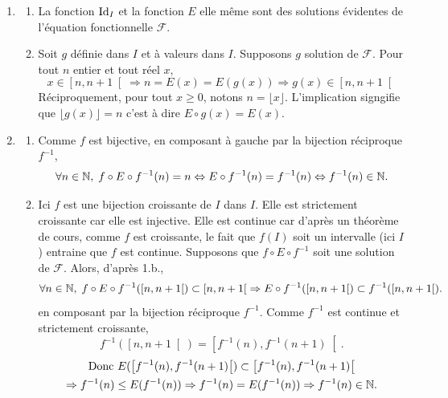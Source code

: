 \begin{enumerate}
  \item 
  \begin{enumerate}
    \item La fonction $\operatorname{Id}_I$ et la fonction $E$ elle même sont des solutions évidentes de l'équation fonctionnelle $\mathcal{F}$.
    \item Soit $g$ définie dans $I$ et à valeurs dans $I$.\newline
Supposons $g$ solution de $\mathcal{F}$. Pour tout $n$ entier et tout réel $x$,
\[
  x \in \left[ n, n + 1 \right[ \Rightarrow n = E(x) = E(g(x)) \Rightarrow  g(x) \in \left[ n, n + 1 \right[
\]
Réciproquement, pour tout $x\geq 0$, notons $n = \lfloor x \rfloor$. L'implication signgifie que $\lfloor g(x) \rfloor = n$ c'est à dire $E \circ g (x) = E(x)$.
  \end{enumerate}

  \item
  \begin{enumerate}
    \item Comme $f$ est bijective, en composant à gauche par la bijection réciproque $f^{-1}$,
\[
\forall n \in \mathbb{N},\;  f \circ E \circ f^{-1}(n) = n \Leftrightarrow E \circ f^{-1}(n) = f^{-1}(n) \Leftrightarrow f^{-1}(n) \in \mathbb{N}.
\]
    
    \item Ici $f$ est une bijection croissante de $I$ dans $I$. Elle est strictement croissante car elle est injective. Elle est continue car d'après un théorème de cours, comme $f$ est croissante, le fait que $f(I)$ soit un intervalle (ici $I$) entraine que $f$ est continue.\newline
    Supposons que $f \circ E \circ f^{-1}$ soit une solution de $\mathcal{F}$. Alors, d'après 1.b., 
    \[
\forall n \in \mathbb{N},\;    f\circ E \circ f^{-1}(\left[ n, n + 1 \right[) \subset \left[ n, n + 1 \right[
\Rightarrow E \circ f^{-1}(\left[ n, n + 1 \right[) \subset f^{-1}(\left[ n, n + 1 \right[) .
    \]
en composant par la bijection réciproque $f^{-1}$. Comme $f^{-1}$ est continue et strictement croissante,
\[
  f^{-1}(\left[ n, n + 1 \right[) = \left[ f^{-1}(n), f^{-1}(n + 1) \right[.
\]
\begin{multline*}
  \text{Donc }E(\left[ f^{-1}(n), f^{-1}(n + 1) \right[) \subset \left[ f^{-1}(n), f^{-1}(n + 1) \right[ \\
  \Rightarrow f^{-1}(n) \leq E( f^{-1}(n))
  \Rightarrow f^{-1}(n) = E(f^{-1}(n))
  \Rightarrow f^{-1}(n) \in \mathbb{N} .
\end{multline*}


\end{enumerate}
\end{enumerate}
